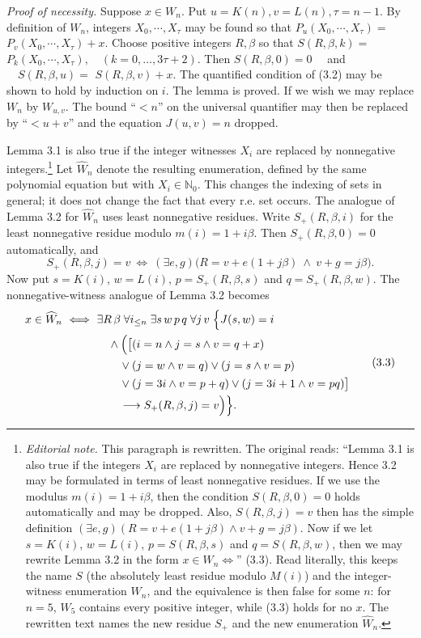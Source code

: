 \documentclass[11pt,a4paper]{article}
\newcommand{\origpage}[1]{\marginnote{\footnotesize\textbf{[#1]}}}
\newcommand{\ednote}[1]{\footnote{\textit{Editorial note.} #1}}
\newcommand{\NN}{\mathbb{N}_0}
\newcommand{\WW}{\widehat W}
\begin{document}
\noindent\textit{Proof of necessity.} Suppose $x \in W_{n}$. Put $u=K(n), v=L(n), \tau=n-1$. By definition of $W_{n}$, integers $X_{0}, \cdots, X_{\tau}$ may be found so that $P_{u}\left(X_{0}, \cdots, X_{\tau}\right)=$ $P_{v}\left(X_{0}, \cdots, X_{\tau}\right)+x$. Choose positive integers $R, \beta$ so that $S(R, \beta, k)=$ $P_{k}\left(X_{0}, \cdots, X_{\tau}\right), \quad(k=0,\ldots,3\tau+2)$. Then $S(R, \beta, 0)=0 \quad$ and $\quad S(R, \beta, u)=$ $S(R, \beta, v)+x$. The quantified condition of (3.2) may be shown to hold by induction on $i$. The lemma is proved. If we wish we may replace $W_{n}$ by $W_{u, v}$. The bound ``$<n$'' on the universal quantifier may then be replaced by ``$<u+v$'' and the equation $J(u, v)=n$ dropped.

Lemma 3.1 is also true if the integer witnesses $X_i$ are replaced by
nonnegative integers.\ednote{This paragraph is rewritten. The original reads:
``Lemma 3.1 is also true if the integers $X_i$ are replaced by nonnegative
integers. Hence 3.2 may be formulated in terms of least nonnegative residues. If
we use the modulus $m(i)=1+i\beta$, then the condition $S(R,\beta,0)=0$ holds
automatically and may be dropped. Also, $S(R,\beta,j)=v$ then has the simple
definition $(\exists e,g)(R=v+e(1+j\beta)\wedge v+g=j\beta)$. Now if we let
$s=K(i)$, $w=L(i)$, $p=S(R,\beta,s)$ and $q=S(R,\beta,w)$, then we may rewrite
Lemma 3.2 in the form $x\in W_n\Leftrightarrow$'' (3.3). Read literally, this keeps
the name $S$ (the absolutely least residue modulo $M(i)$) and the integer-witness
enumeration $W_n$, and the equivalence is then false for some $n$: for $n=5$,
$W_5$ contains every positive integer, while (3.3) holds for no $x$. The
rewritten text names the new residue $S_+$ and the new enumeration $\WW_n$.} Let $\WW_n$ denote the resulting enumeration, defined by
the same polynomial equation but with $X_i\in\NN$. This changes the indexing of
sets in general; it does not change the fact that every r.e. set occurs.
The analogue of Lemma 3.2 for $\WW_n$ uses least nonnegative residues.
Write $S_+(R,\beta,i)$ for the least nonnegative residue modulo $m(i)=1+i\beta$.
Then $S_+(R,\beta,0)=0$ automatically, and
\[
S_+(R,\beta,j)=v\ \Longleftrightarrow\
(\exists e,g)\bigl(R=v+e(1+j\beta)\ \wedge\ v+g=j\beta\bigr).
\]
\origpage{347}Now put $s=K(i)$, $w=L(i)$, $p=S_+(R,\beta,s)$ and $q=S_+(R,\beta,w)$.
The nonnegative-witness analogue of Lemma 3.2 becomes
\begin{equation*}
\begin{aligned}
x\in\WW_n\ \Longleftrightarrow\ {}
&\exists R\,\beta\;\forall i_{\leq n}\;\exists s\,w\,p\,q\;\forall j\,v\;
\Bigl\{J(s,w)=i\\
&\quad\wedge\Bigl(\bigl[(i=n\wedge j=s\wedge v=q+x)\\
&\qquad\vee(j=w\wedge v=q)\vee(j=s\wedge v=p)\\
&\qquad\vee(j=3i\wedge v=p+q)\vee(j=3i+1\wedge v=pq)\bigr]\\
&\qquad\longrightarrow S_+(R,\beta,j)=v\Bigr)\Bigr\}.
\end{aligned}\tag{3.3}
\end{equation*}
\end{document}
